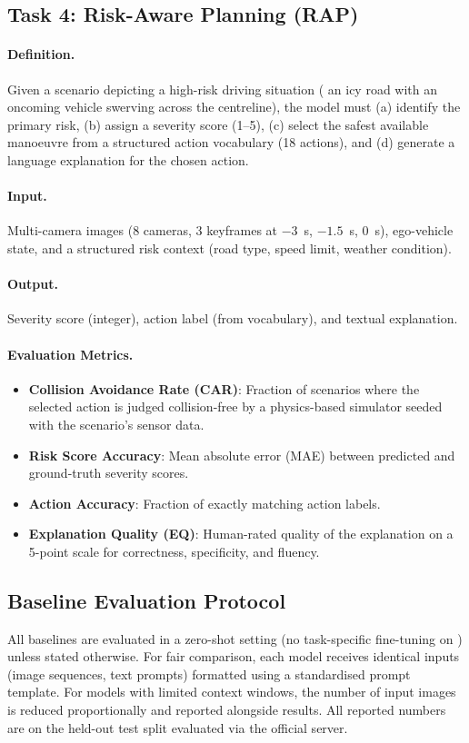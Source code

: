 \subsection{Task 4: Risk-Aware Planning (RAP)}
\label{ssec:task_rap}

\paragraph{Definition.}
Given a scenario depicting a high-risk driving situation (\eg{} an icy road with
an oncoming vehicle swerving across the centreline), the model must (a) identify the
primary risk, (b) assign a severity score (1--5), (c) select the safest available
manoeuvre from a structured action vocabulary (18 actions), and (d) generate a
language explanation for the chosen action.

\paragraph{Input.}
Multi-camera images (8 cameras, 3 keyframes at $-3$~s, $-1.5$~s, $0$~s), ego-vehicle
state, and a structured risk context (road type, speed limit, weather condition).

\paragraph{Output.}
Severity score (integer), action label (from vocabulary), and textual explanation.

\paragraph{Evaluation Metrics.}
\begin{itemize}[leftmargin=2em, noitemsep]
  \item \textbf{Collision Avoidance Rate (CAR)}: Fraction of scenarios where the
        selected action is judged collision-free by a physics-based simulator seeded
        with the scenario's sensor data.
  \item \textbf{Risk Score Accuracy}: Mean absolute error (MAE) between predicted and
        ground-truth severity scores.
  \item \textbf{Action Accuracy}: Fraction of exactly matching action labels.
  \item \textbf{Explanation Quality (EQ)}: Human-rated quality of the explanation
        on a 5-point scale for correctness, specificity, and fluency.
\end{itemize}

\subsection{Baseline Evaluation Protocol}
\label{ssec:benchmark_protocol}

All baselines are evaluated in a zero-shot setting (no task-specific fine-tuning
on \lucid{}) unless stated otherwise. For fair comparison, each model receives
identical inputs (image sequences, text prompts) formatted using a standardised
prompt template. For models with limited context windows, the number of input images
is reduced proportionally and reported alongside results. All reported numbers
are on the held-out test split evaluated via the official server.
